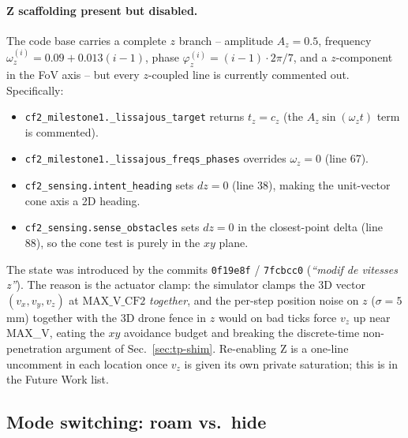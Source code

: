 \documentclass[11pt,a4paper]{article}
\newcommand{\code}[1]{\texttt{#1}}
\begin{document}
\paragraph{Z scaffolding present but disabled.}
The code base carries a complete $z$ branch -- amplitude $A_z = 0.5$,
frequency $\omega_z^{(i)} = 0.09 + 0.013(i-1)$, phase
$\varphi_z^{(i)} = (i-1)\cdot 2\pi/7$, and a $z$-component in the FoV axis --
but every $z$-coupled line is currently commented out. Specifically:
\begin{itemize}[leftmargin=1.4em,topsep=2pt]
  \item \code{cf2\_milestone1.\_lissajous\_target} returns
        $t_z = c_z$ (the $A_z\sin(\omega_z t)$ term is commented).
  \item \code{cf2\_milestone1.\_lissajous\_freqs\_phases} overrides
        $\omega_z = 0$ (line 67).
  \item \code{cf2\_sensing.intent\_heading} sets $dz = 0$
        (line 38), making the unit-vector cone axis a 2D heading.
  \item \code{cf2\_sensing.sense\_obstacles} sets $dz = 0$
        in the closest-point delta (line 88), so the cone test is purely
        in the $xy$ plane.
\end{itemize}
The state was introduced by the commits \code{0f19e8f} / \code{7fcbcc0}
(\textit{``modif de vitesses z''}). The reason is the actuator clamp: the
simulator clamps the 3D vector $(v_x, v_y, v_z)$ at $\text{MAX\_V\_CF2}$
\emph{together}, and the per-step position noise on $z$ ($\sigma = 5$\,mm)
together with the 3D drone fence in $z$ would on bad ticks force $v_z$ up
near MAX\_V, eating the $xy$ avoidance budget and breaking the discrete-time
non-penetration argument of Sec.~\ref{sec:tp-shim}. Re-enabling Z is a
one-line uncomment in each location once $v_z$ is given its own private
saturation; this is in the Future Work list.

\subsection{Mode switching: roam vs.\ hide}
\end{document}
